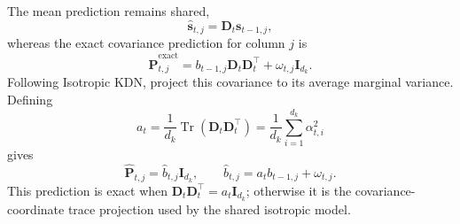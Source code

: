 \documentclass[11pt]{article}
\newcommand{\vct}[1]{\boldsymbol{#1}}
\begin{document}
The mean prediction remains shared,
\begin{equation}
  \widehat{\vct{s}}_{t,j}=\vct{D}_t\vct{s}_{t-1,j},
  \label{eq:discussion-value-iso-mean-prediction}
\end{equation}
whereas the exact covariance prediction for column $j$ is
\begin{equation}
  \widehat{\vct{P}}_{t,j}^{\mathrm{exact}}
  =b_{t-1,j}\vct{D}_t\vct{D}_t^\top
   +\omega_{t,j}\vct{I}_{d_k}.
  \label{eq:discussion-value-iso-exact-prediction}
\end{equation}
Following Isotropic KDN, project this covariance to its average marginal variance. Defining
\begin{equation}
  a_t
  =\frac{1}{d_k}\operatorname{Tr}(\vct{D}_t\vct{D}_t^\top)
  =\frac{1}{d_k}\sum_{i=1}^{d_k}\alpha_{t,i}^2
  \label{eq:discussion-value-iso-transition-average}
\end{equation}
gives
\begin{equation}
  \widehat{\vct{P}}_{t,j}
  =\widehat b_{t,j}\vct{I}_{d_k},
  \qquad
  \widehat b_{t,j}=a_tb_{t-1,j}+\omega_{t,j}.
  \label{eq:discussion-value-iso-prediction}
\end{equation}
This prediction is exact when
$\vct{D}_t\vct{D}_t^\top=a_t\vct{I}_{d_k}$; otherwise it is the covariance-coordinate trace
projection used by the shared isotropic model.
\end{document}
